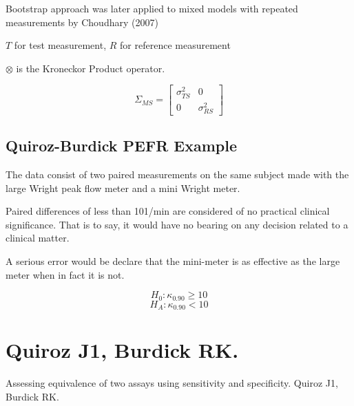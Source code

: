 \documentclass[MAIN.tex]{subfiles}
\begin{document}
Bootstrap approach was later applied to mixed models with repeated measurements by Choudhary (2007)

$T$ for test measurement, $R$ for reference measurement


$\otimes$ is the Kroneckor Product operator.

\[  \Sigma_{MS} =  \left[     \begin{array}{cc} \sigma^2_{TS} & 0 \\ 0 & \sigma^2_{RS} \end{array}\right] \]




\section{Quiroz-Burdick PEFR Example}

The data consist of two paired measurements on the same subject made with the large Wright peak flow meter and a mini
Wright meter.

Paired differences of less than 101/min are considered of no practical clinical significance. That is to say, it would have no bearing on
any decision related to a clinical matter.

A serious error would be declare that the mini-meter is as effective as the large meter when in fact it is not.


\[ H_0 : \kappa_{0.90} \geq 10 \]
\[ H_A : \kappa_{0.90} < 10 \]









\chapter{Quiroz J1, Burdick RK.}
Assessing equivalence of two assays using sensitivity and specificity.
Quiroz J1, Burdick RK.
\end{document}
